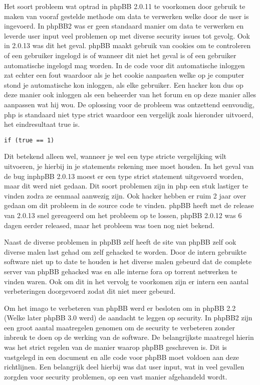 Het soort probleem wat optrad in phpBB 2.0.11 te voorkomen door gebruik te maken van vooraf gestelde methode om data te verwerken welke door de user is ingevoerd. In phpBB2 was er geen standaard manier om data te verwerken en leverde user input veel problemen op met diverse security issues tot gevolg. Ook in 2.0.13 was dit het geval. phpBB maakt gebruik van cookies om te controleren of een gebruiker ingelogd is of wanneer dit niet het geval is of een gebruiker automatische ingelogd mag worden. In de code voor dit automatische inloggen zat echter een fout waardoor als je het cookie aanpasten welke op je computer stond je automatische kon inloggen, als elke gebruiker. Een hacker kon dus op deze manier ook inloggen als een beheerder van het forum en op deze manier alles aanpassen wat hij wou. De oplossing voor de probleem was ontzettend eenvoudig, php is standaard niet type strict waardoor een vergelijk zoals hieronder uitvoerd, het eindresultaat true is.
\begin{verbatim}
if (true == 1)
\end{verbatim}
Dit betekend alleen wel, wanneer je wel een type stricte vergelijking wilt uitvoeren, je hierbij in je statements rekening mee moet houden. In het geval van de bug inphpBB 2.0.13 moest er een type strict statement uitgevoerd worden, maar dit werd niet gedaan. Dit soort problemen zijn in php een stuk lastiger te vinden zodra ze eenmaal aanwezig zijn. Ook hacker hebben er ruim 2 jaar over gedaan om dit probleem in de source code te vinden. phpBB heeft met de release van 2.0.13 snel gereageerd om het probleem op te lossen, phpBB 2.0.12 was 6 dagen eerder released, maar het probleem was toen nog niet bekend.

Naast de diverse problemen in phpBB zelf heeft de site van phpBB zelf ook diverse malen last gehad om zelf gehacked te worden. Door de intern gebruikte software niet up to date te houden is het diverse malen gebeurd dat de complete server van phpBB gehacked was en alle interne fora op torrent netwerken te vinden waren. Ook om dit in het vervolg te voorkomen zijn er intern een aantal verbeteringen doorgevoerd zodat dit niet meer gebeurd.

Om het imago te verbeteren van phpBB werd er besloten om in phpBB 2.2 (Welke later phpBB 3.0 werd\cite{bib.phpbb.2word3}) de aandacht te leggen op security. In phpBB2 zijn een groot aantal maatregelen genomen om de security te verbeteren zonder inbreuk te doen op de werking van de software. De belangrijkste maatregel hierin was het strict regelen van de manier waarop phpBB geschreven is. Dit is vastgelegd in een document en alle code voor phpBB moet voldoen aan deze richtlijnen. Een belangrijk deel hierbij was dat user input, wat in veel gevallen zorgden voor security problemen, op een vast manier afgehandeld wordt.

           
